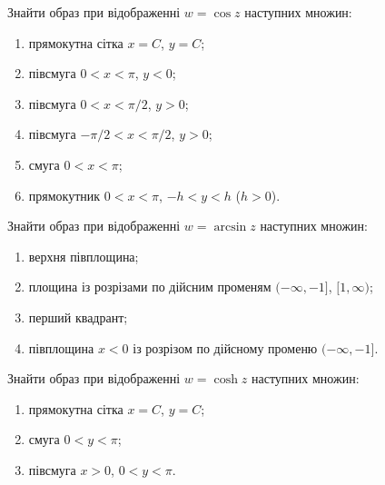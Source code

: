 \begin{solution}

\end{solution}

\begin{problem}[Волковиський, 2.150]
    Знайти образ при відображенні $w = \cos z$ наступних множин:
    \begin{enumerate}
        \item прямокутна сітка $x = C$, $y = C$;
        \item півсмуга $0 < x < \pi$, $y < 0$;
        \item півсмуга $0 < x < \pi / 2$, $y > 0$;
        \item півсмуга $- \pi / 2 < x < \pi / 2$, $y > 0$;
        \item смуга $0 < x < \pi$;
        \item прямокутник $0 < x < \pi$, $-h < y < h$ ($h > 0$).
    \end{enumerate}
\end{problem}

\begin{solution}

\end{solution}

\begin{problem}[Волковиський, 2.151]
    Знайти образ при відображенні $w = \arcsin z$ наступних множин:
    \begin{enumerate}
        \item верхня півплощина;
        \item площина із розрізами по дійсним променям $(-\infty, -1]$, $[1, \infty)$;
        \item перший квадрант;
        \item півплощина $x < 0$ із розрізом по дійсному променю $(-\infty, -1]$.
    \end{enumerate}
\end{problem}

\begin{solution}

\end{solution}

\begin{problem}[Волковиський, 2.152]
    Знайти образ при відображенні $w = \cosh z$ наступних множин:
    \begin{enumerate}
        \item прямокутна сітка $x = C$, $y = C$;
        \item смуга $0 < y < \pi$;
        \item півсмуга $x > 0$, $0 < y < \pi$.
    \end{enumerate}
\end{problem}

